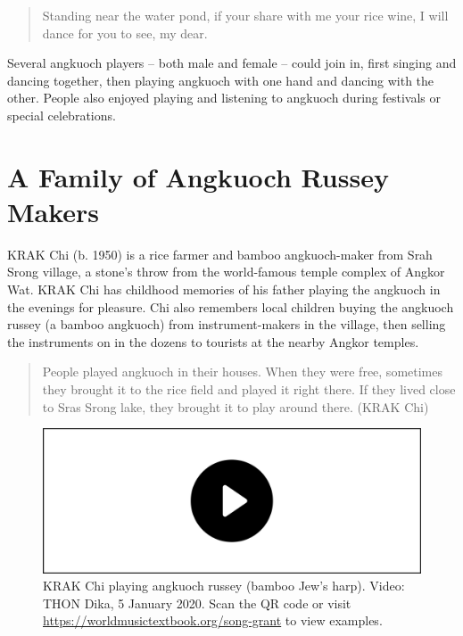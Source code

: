 \documentclass[twoside]{article}
\providecommand{\wmturl}{\href{https://worldmusictextbook.org/song-grant}{https://worldmusictextbook.org/song-grant}}
\providecommand{\wmturlcaption}{
  Scan the QR code or visit \wmturl{} to view examples.
}
\begin{document}
\begin{quote}
Standing near the water pond, if your share with me your rice wine, I
will dance for you to see, my dear.
\end{quote}

Several angkuoch players -- both male and female -- could join in, first
singing and dancing together, then playing angkuoch with one hand and
dancing with the other. People also enjoyed playing and listening to
angkuoch during festivals or special celebrations.

\hypertarget{a-family-of-angkuoch-russey-makers}{%
\section*{A Family of Angkuoch Russey
Makers}\label{a-family-of-angkuoch-russey-makers}}

KRAK Chi (b. 1950) is a rice farmer and bamboo angkuoch-maker from Srah
Srong village, a stone's throw from the world-famous temple complex of
Angkor Wat. KRAK Chi has childhood memories of his father playing the
angkuoch in the evenings for pleasure. Chi also remembers local children
buying the angkuoch russey (a bamboo angkuoch) from instrument-makers in
the village, then selling the instruments on in the dozens to tourists
at the nearby Angkor temples.

\begin{quote}
People played angkuoch in their houses. When they were free, sometimes
they brought it to the rice field and played it right there. If they
lived close to Sras Srong lake, they brought it to play around there.
(KRAK Chi)
\end{quote}

\begin{figure}
  \includegraphics[width=\textwidth]{../play-video.png}
  \caption{KRAK Chi playing angkuoch russey (bamboo Jew's harp). Video: THON Dika, 5 January 2020. \wmturlcaption}
\end{figure}
\end{document}
